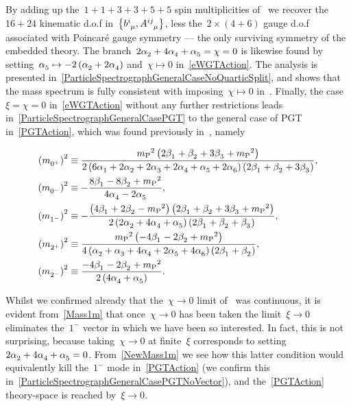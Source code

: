 \documentclass[aps,prd,reprint,preprintnumbers,showpacs,floatfix,nofootinbib,superscript address]{revtex4-2}
\begin{document}
By adding up the~$1+1+3+3+5+5$ spin multiplicities of~ we recover the~$16+24$ kinematic d.o.f in~$\big\{\FieldB{^i_\mu},\FieldA{^{ij}_\mu}\big\}$, less the~$2\times(4+6)$ gauge d.o.f associated with Poincar\'e gauge symmetry --- the only surviving symmetry of the embedded theory. The branch~$2\Alp{2}+4\Alp{4}+\Alp{5}=\chi=0$ is likewise found by setting~$\Alp{5}\mapsto-2\left(\Alp{2}+2\Alp{4}\right)$ and~$\chi\mapsto 0$ in~\cref{eWGTAction}. The analysis is presented in~\cref{ParticleSpectrographGeneralCaseNoQuarticSplit}, and shows that the mass spectrum is fully consistent with imposing~$\chi\mapsto 0$ in~. Finally, the case~$\xi=\chi=0$ in~\cref{eWGTAction} without any further restrictions leads in~\cref{ParticleSpectrographGeneralCasePGT} to the general case of PGT in~\cref{PGTAction}, which was found previously in~\cite{Hayashi:1980qp}, namely
\begin{widetext}
\begin{subequations}
\begin{align}
	\MassSquared{0^+}&\equiv\frac{\MPl{}^2\left(2\Bet{1}+\Bet{2}+3\Bet{3}+\MPl{}^2\right)}{2\left(6\Alp{1}+2\Alp{2}+2\Alp{3}+2\Alp{4}+\Alp{5}+2\Alp{6}\right)\left(2\Bet{1}+\Bet{2}+3\Bet{3}\right)},\label{NewMass0p}\\
	\MassSquared{0^-}&\equiv-\frac{8\Bet{1}-8\Bet{2}+\MPl{}^2}{4\Alp{4}-2\Alp{5}},\label{NewMass0m}\\
	\MassSquared{1^-}&\equiv-\frac{\left(4\Bet{1}+2\Bet{2}-\MPl{}^2\right)\left(2\Bet{1}+\Bet{2}+3\Bet{3}+\MPl{}^2\right)}{2\left(2\Alp{2}+4\Alp{4}+\Alp{5}\right)\left(2\Bet{1}+\Bet{2}+\Bet{3}\right)},\label{NewMass1m}\\
	\MassSquared{2^+}&\equiv\frac{\MPl{}^2\left(-4\Bet{1}-2\Bet{2}+\MPl{}^2\right)}{4\left(\Alp{2}+\Alp{3}+4\Alp{4}+2\Alp{5}+4\Alp{6}\right)\left(2\Bet{1}+\Bet{2}\right)},\label{NewMass2p}\\
	\MassSquared{2^-}&\equiv\frac{-4\Bet{1}-2\Bet{2}+\MPl{}^2}{2\left(4\Alp{4}+\Alp{5}\right)}.\label{NewMass2m}
\end{align}
\end{subequations}
\end{widetext}
Whilst we confirmed already that the~$\chi\to 0$ limit of~ was continuous, it is evident from~\cref{Mass1m} that once~$\chi\to 0$ has been taken the limit~$\xi\to 0$ eliminates the~$1^-$ vector in which we have been so interested. In fact, this is not surprising, because taking~$\chi\to 0$ at finite~$\xi$ corresponds to setting~$2\Alp{2}+4\Alp{4}+\Alp{5}=0$. From~\cref{NewMass1m} we see how this latter condition would equivalently kill the~$1^-$ mode in~\cref{PGTAction} (we confirm this in~\cref{ParticleSpectrographGeneralCasePGTNoVector}), and the~\cref{PGTAction} theory-space is reached by~$\xi\to 0$.
\end{document}
